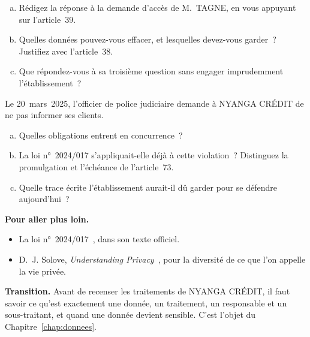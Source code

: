 \begin{boxexo}[title={\ding{45}\quad Exercice~0.3. Répondre à M. TAGNE \niveaumoyen}]
\begin{enumerate}[(a)]
    \item Rédigez la réponse à la demande d'accès de M.~TAGNE, en vous
          appuyant sur l'article~39.
    \item Quelles données pouvez-vous effacer, et lesquelles devez-vous
          garder~? Justifiez avec l'article~38.
    \item Que répondez-vous à sa troisième question sans engager
          imprudemment l'établissement~?
\end{enumerate}
\end{boxexo}

\begin{boxexo}[title={\ding{45}\quad Exercice~0.4. Le silence demandé \niveauexpert}]
Le 20~mars~2025, l'officier de police judiciaire demande à NYANGA CRÉDIT de
ne pas informer ses clients.
\begin{enumerate}[(a)]
    \item Quelles obligations entrent en concurrence~?
    \item La loi n°~2024/017 s'appliquait-elle déjà à cette violation~?
          Distinguez la promulgation et l'échéance de l'article~73.
    \item Quelle trace écrite l'établissement aurait-il dû garder pour se
          défendre aujourd'hui~?
\end{enumerate}
\end{boxexo}

\bigskip

\begin{boxinfo}
\textbf{Pour aller plus loin.}
\begin{itemize}
    \item La loi n°~2024/017~\cite{loi2024017}, dans son texte officiel.
    \item D.~J. Solove, \textit{Understanding Privacy}~\cite{solove2008},
          pour la diversité de ce que l'on appelle la vie privée.
\end{itemize}
\end{boxinfo}

\begin{boxinfo}
\textbf{Transition.} Avant de recenser les traitements de NYANGA CRÉDIT, il
faut savoir ce qu'est exactement une donnée, un traitement, un responsable
et un sous-traitant, et quand une donnée devient sensible. C'est l'objet du
Chapitre~\ref{chap:donnees}.
\end{boxinfo}
